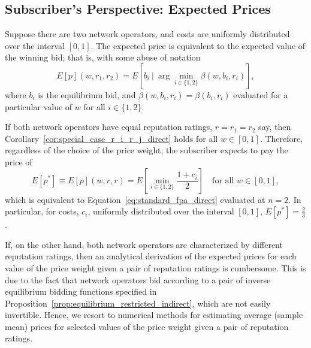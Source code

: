 \subsection{Subscriber's Perspective: Expected Prices} %
\label{sub:subscriber_s_perspective_expected_prices_indirect}
Suppose there are two network operators, and costs are uniformly distributed over the interval $[0,1]$. The expected price is equivalent to the expected value of the winning bid; that is, with some abuse of notation
\begin{equation}
  \label{eq:exp_price_def_indirect}
  E[p](w,r_1,r_2) = E[b_i \:\vert\: \arg\min_{i\in \{1,2\}}\beta(w,b_i,r_i)],
\end{equation}
where $b_i$ is the equilibrium bid, and $\beta(w,b_i,r_i) = \beta(b_i,r_i)$ evaluated for a particular value of $w$ for all $i\in \{1,2\}$.

If both network operators have equal reputation ratings, $r = r_1 = r_2$ say, then Corollary~\ref{cor:special_case_r_i_r_j_direct} holds for all $w\in [0,1]$. Therefore, regardless of the choice of the price weight, the subscriber expects to pay the price of
\begin{equation}
  \label{eq:exp_price_at_w_1_indirect}
  E[p^*] \equiv E[p](w,r,r) = E\left[\min_{i\in \{1,2\}}\frac{1+c_i}{2}\right] \quad\textrm{for all } w\in [0,1],
\end{equation}
which is equivalent to Equation~\eqref{eq:standard_fpa_direct} evaluated at $n=2$. In particular, for costs, $c_i$, uniformly distributed over the interval $[0,1]$, $E[p^*] = \frac{2}{3}$.

If, on the other hand, both network operators are characterized by different reputation ratings, then an analytical derivation of the expected prices for each value of the price weight given a pair of reputation ratings is cumbersome. This is due to the fact that network operators bid according to a pair of inverse equilibrium bidding functions specified in Proposition~\ref{prop:equilibrium_restricted_indirect}, which are not easily invertible. Hence, we resort to numerical methods for estimating average (sample mean) prices for selected values of the price weight given a pair of reputation ratings.

